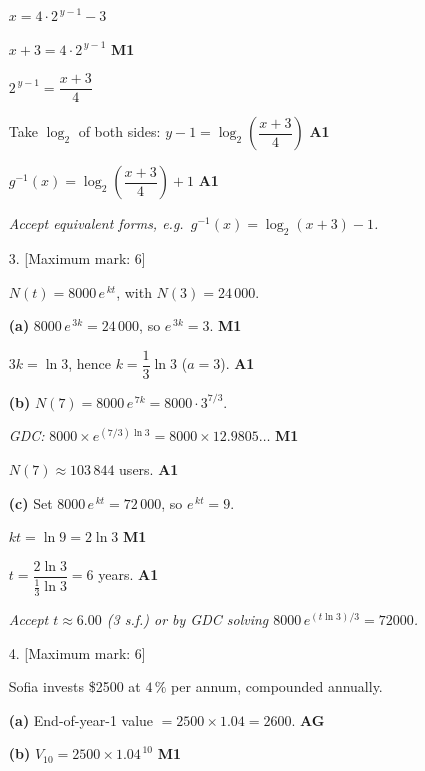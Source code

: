 \documentclass[12pt, twoside]{article}
\begin{document}
\begin{enumerate}[itemsep=0.3cm]
$x = 4 \cdot 2^{\,y - 1} - 3$

$x + 3 = 4 \cdot 2^{\,y - 1}$ \hfill \textbf{M1}

$2^{\,y - 1} = \dfrac{x + 3}{4}$

Take $\log_{2}$ of both sides:
$y - 1 = \log_{2}\!\left(\dfrac{x+3}{4}\right)$ \hfill \textbf{A1}

$g^{-1}(x) = \log_{2}\!\left(\dfrac{x + 3}{4}\right) + 1$
\hfill \textbf{A1}

\emph{Accept equivalent forms, e.g.\
$g^{-1}(x) = \log_{2}(x + 3) - 1$.}

\newpage

\item[3.] [Maximum mark: 6]

$N(t) = 8000\, e^{\,kt}$, with $N(3) = 24\,000$.

\medskip

\textbf{(a)} $8000\, e^{\,3k} = 24\,000$, so $e^{\,3k} = 3$.
\hfill \textbf{M1}

$3k = \ln 3$, hence $k = \dfrac{1}{3}\ln 3$ \quad ($a = 3$).
\hfill \textbf{A1}

\medskip

\textbf{(b)} $N(7) = 8000\, e^{\,7k} = 8000 \cdot 3^{7/3}$.

\emph{GDC: } $8000 \times e^{(7/3)\ln 3} = 8000 \times 12.9805\ldots$
\hfill \textbf{M1}

$N(7) \approx 103\,844$ users. \hfill \textbf{A1}

\medskip

\textbf{(c)} Set $8000\, e^{\,kt} = 72\,000$, so $e^{\,kt} = 9$.

$kt = \ln 9 = 2\ln 3$ \hfill \textbf{M1}

$t = \dfrac{2 \ln 3}{\frac{1}{3}\ln 3} = 6$ years. \hfill \textbf{A1}

\emph{Accept $t \approx 6.00$ (3 s.f.) or by GDC solving
$8000\, e^{(t \ln 3)/3} = 72000$.}

\newpage

\item[4.] [Maximum mark: 6]

Sofia invests \$2500 at $4\,\%$ per annum, compounded annually.

\medskip

\textbf{(a)} End-of-year-1 value $= 2500 \times 1.04 = 2600$. \hfill \textbf{AG}

\medskip

\textbf{(b)} $V_{10} = 2500 \times 1.04^{\,10}$ \hfill \textbf{M1}


\end{enumerate}
\end{document}
